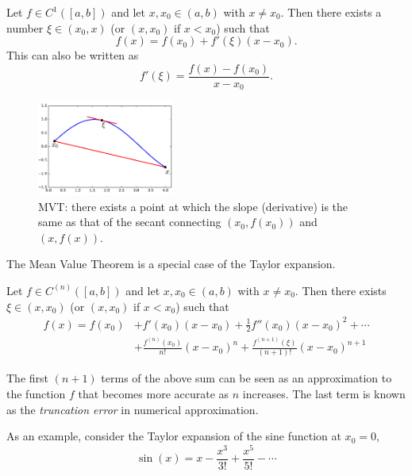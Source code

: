 \begin{theorem*}
Let $f\in C^1([a,b])$ and let $x,x_0\in (a,b)$ with $x\neq x_0$. 
Then there exists a number $\xi\in (x_0,x)$ (or $(x,x_0)$ if $x<x_0$) such that
\begin{equation*}
  f(x) = f(x_0)+f'(\xi)(x-x_0).
\end{equation*}
This can also be written as
\begin{equation*}
  f'(\xi) = \frac{f(x)-f(x_0)}{x-x_0}.
\end{equation*}
\end{theorem*}

\begin{figure}[h!]
\centering
\includegraphics[width=0.4\textwidth]{images/mvt.pdf}
\caption{\small MVT: there exists a point at which the slope (derivative) is the same as that of the secant connecting $(x_0,f(x_0))$ and $(x,f(x))$.}
\end{figure}

The Mean Value Theorem is a special case of the Taylor expansion.

\begin{theorem*}
Let $f\in C^{(n)}([a,b])$ and let $x,x_0\in(a,b)$ with $x\neq x_0$. Then
there exists $\xi\in (x,x_0)$ (or $(x,x_0)$ if $x<x_0$) such that
\begin{align*}
  f(x) = f(x_0)&+f'(x_0)(x-x_0)+\frac{1}{2}f''(x_0)(x-x_0)^2+\cdots \\
   &+\frac{f^{(n)}(x_0)}{n!}(x-x_0)^n + \frac{f^{(n+1)}(\xi)}{(n+1)!}(x-x_0)^{n+1}
\end{align*}
\end{theorem*}

The first $(n+1)$ terms of the above sum can be seen as an approximation to the function $f$ that becomes more accurate as $n$ increases. 
The last term is known as the {\em truncation error} in numerical approximation.

As an example, consider the Taylor expansion of the sine function at $x_0=0$,
\begin{equation*}
\sin(x) = x-\frac{x^3}{3!}+\frac{x^5}{5!}-\cdots
\end{equation*}

